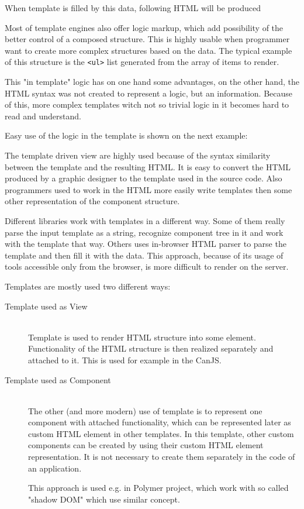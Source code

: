   When template is filled by this data, following HTML will be produced
  

  Most of template engines also offer logic markup, which add possibility of the better control of a composed structure. 
  This is highly usable when programmer want to create more complex structures based on the data. 
  The typical example of this structure is the \texttt{<ul>} list generated from the array of items to render.
  
  This "in template" logic has on one hand some advantages, on the other hand, 
  the HTML syntax was not created to represent a logic, but an information.
  Because of this, more complex templates witch not so trivial logic in it becomes hard to read and understand.
  
  Easy use of the logic in the template is shown on the next example:
  

  The template driven view are highly used because of the syntax similarity between the template and the resulting HTML. 
  It is easy to convert the HTML produced by a graphic designer to the template used in the source code. 
  Also programmers used to work in the HTML more easily write templates then some other representation of the component structure.

  Different libraries work with templates in a different way. 
  Some of them really parse the input template as a string, recognize component tree in it and work with the template that way.
  Others uses in-browser HTML parser to parse the template and then fill it with the data.
  This approach, because of its usage of tools accessible only from the browser, is more difficult to render on the server.

  Templates are mostly used two different ways:
  \begin{description}
    \item[Template used as View] \hfill \\
      Template is used to render HTML structure into some element. 
      Functionality of the HTML structure is then realized separately and attached to it.  
      This is used for example in the CanJS.
    \item[Template used as Component] \hfill \\
      The other (and more modern) use of template is to represent one component with attached functionality, 
      which can be represented later as custom HTML element in other templates. 
      In this template, other custom components can be created by using their custom HTML element representation. 
      It is not necessary to create them separately in the code of an application.

      This approach is used e.g. in Polymer project, which work with so called "shadow DOM" which use similar concept.
  \end{description}

